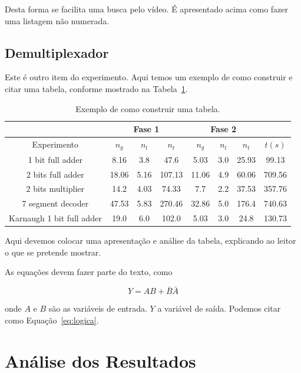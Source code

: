 \documentclass[12pt]{article}
\begin{document}
Desta forma se facilita uma busca pelo vídeo. É apresentado acima como fazer uma listagem não numerada.

\subsection{Demultiplexador}
\label{sec:Demux}

Este é outro item do experimento. Aqui temos um exemplo de como construir e citar uma tabela, conforme mostrado na Tabela~\ref{tab:resultados}.

\begin{table}[H]
    \centering
    \caption{Exemplo de como construir uma tabela.}
    \begin{tabular}{|c|c|c|c|c|c|c|c|}
    \cline{2-7}
    \multicolumn{1}{c}{} & \multicolumn{3}{|c|}{Fase 1} & \multicolumn{3}{c|}{Fase 2} & \multicolumn{1}{c}{} \\
    \hline
    Experimento & $n_g$ & $n_l$ & $n_t$ & $n_g$ & $n_l$ & $n_t$ & $t(s)$ \\
    \hline
    1 bit full adder & 8.16 & 3.8 & 47.6 & 5.03 & 3.0 & 25.93 & 99.13 \\
    2 bits full adder & 18.06 & 5.16 & 107.13 & 11.06 & 4.9 & 60.06 & 709.56 \\
    2 bits multiplier & 14.2 & 4.03 & 74.33 & 7.7 & 2.2 & 37.53 & 357.76 \\
    7 segment decoder & 47.53 & 5.83 & 270.46 & 32.86 & 5.0 & 176.4 & 740.63 \\
    Karnaugh 1 bit full adder & 19.0 & 6.0 & 102.0 & 5.03 & 3.0 & 24.8 & 130.73 \\
    \hline
    \end{tabular}
    \label{tab:resultados}
\end{table}

Aqui devemos colocar uma apresentação e análise da tabela, explicando ao leitor o que se pretende mostrar.

As equações devem fazer parte do texto, como 

\begin{equation}
\label{eq:logica}
    Y=AB+\bar{B}\bar{A}
\end{equation}

\noindent onde $A$ e $B$ são as variáveis de entrada. $Y$ a variável de saída. Podemos citar como Equação~\ref{eq:logica}.

\section{Análise dos Resultados}
\label{sec:Resultados}
\end{document}
